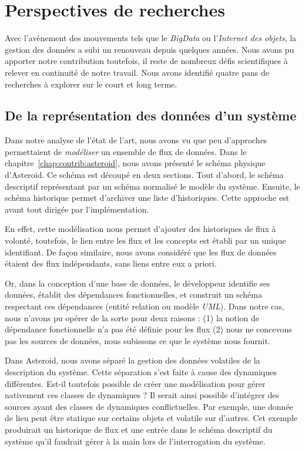 \section{Perspectives de recherches}\label{sec:conclusion:perspectives}
Avec l'avènement des mouvements tels que le \textit{BigData} ou l'\textit{Internet des objets}, la gestion des données a subi un renouveau depuis quelques années. Nous avons pu apporter notre contribution toutefois, il reste de nombreux défis scientifiques à relever en continuité de notre travail. Nous avons identifié quatre pans de recherches à explorer sur le court et long terme.

\subsection{De la représentation des données d'un système}
Dans notre analyse de l'état de l'art, nous avons vu que peu d'approches permettaient de \textit{modéliser} un ensemble de flux de données. Dans le chapitre~\ref{chap:contrib:asteroid}, nous avons présenté le schéma physique d'Asteroid. Ce schéma est découpé en deux sections. Tout d'abord, le schéma descriptif représentant par un schéma normalisé le modèle du système. Ensuite, le schéma historique permet d'archiver une liste d'historiques. Cette approche est avant tout dirigée par l'implémentation.

En effet, cette modélisation nous permet d'ajouter des historiques de flux à volonté, toutefois, le lien entre les flux et les concepts est établi par un unique identifiant. De façon similaire, nous avons considéré que les flux de données étaient des flux indépendants, sans liens entre eux a priori.

Or, dans la conception d'une base de données, le développeur identifie ses données, établit des dépendances fonctionnelles, et construit un schéma respectant ces dépendances (entité relation ou modèle \textit{UML}). Dans notre cas, nous n'avons pu opérer de la sorte pour deux raisons : (1) la notion de dépendance fonctionnelle n'a pas été définie pour les flux (2) nous ne concevons pas les sources de données, nous subissons ce que le système nous fournit.

Dans Asteroid, nous avons séparé la gestion des données volatiles de la description du système. Cette séparation s'est faite à cause des dynamiques différentes. Est-il toutefois possible de créer une modélisation pour gérer nativement ces classes de dynamiques ? Il serait ainsi possible d'intégrer des sources ayant des classes de dynamiques conflictuelles. Par exemple, une donnée de lieu peut être statique sur certains objets et volatile sur d'autres. Cet exemple produirait un historique de flux et une entrée dans le schéma descriptif du système qu'il faudrait gérer à la main lors de l'interrogation du système.

